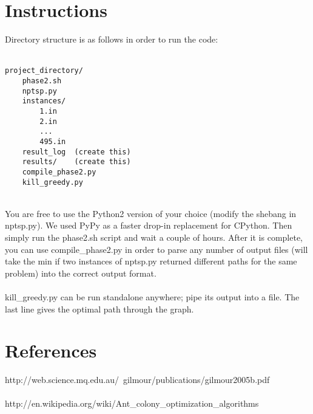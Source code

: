 \documentclass{article}
\begin{document}
\section*{Instructions}
Directory structure is as follows in order to run the code: \\\\
\begin{verbatim}
project_directory/
    phase2.sh
    nptsp.py
    instances/
        1.in
        2.in
        ...
        495.in
    result_log  (create this)
    results/    (create this)
    compile_phase2.py
    kill_greedy.py
\end{verbatim} \\
You are free to use the Python2 version of your choice (modify the shebang in nptsp.py). We used PyPy as a faster drop-in replacement for CPython. Then simply run the phase2.sh script and wait a couple of hours. After it is complete, you can use compile_phase2.py in order to parse any number of output files (will take the min if two instances of nptsp.py returned different paths for the same problem) into the correct output format. \\\\
kill_greedy.py can be run standalone anywhere; pipe its output into a file. The last line gives the optimal path through the graph. \\

\section*{References}
http://web.science.mq.edu.au/~gilmour/publications/gilmour2005b.pdf \\\\
http://en.wikipedia.org/wiki/Ant_colony_optimization_algorithms
\end{document}
